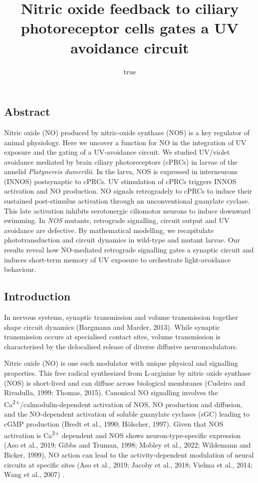 \documentclass[
  10pt,
  onecolumn]{article}
\title{Nitric oxide feedback to ciliary photoreceptor cells gates a UV
avoidance circuit}
\author{true}
\date{}
\begin{document}
\maketitle

\hypertarget{abstract}{%
\subsection{Abstract}\label{abstract}}

Nitric oxide (NO) produced by nitric-oxide synthase (NOS) is a key
regulator of animal physiology. Here we uncover a function for NO in the
integration of UV exposure and the gating of a UV-avoidance circuit. We
studied UV/violet avoidance mediated by brain ciliary photoreceptors
(cPRCs) in larvae of the annelid \emph{Platynereis dumerilii}. In the
larva, NOS is expressed in interneurons (INNOS) postsynaptic to cPRCs.
UV stimulation of cPRCs triggers INNOS activation and NO production. NO
signals retrogradely to cPRCs to induce their sustained post-stimulus
activation through an unconventional guanylate cyclase. This late
activation inhibits serotonergic ciliomotor neurons to induce downward
swimming. In \emph{NOS} mutants, retrograde signalling, circuit output
and UV avoidance are defective. By mathematical modelling, we
recapitulate phototransduction and circuit dynamics in wild-type and
mutant larvae. Our results reveal how NO-mediated retrograde signalling
gates a synaptic circuit and induces short-term memory of UV exposure to
orchestrate light-avoidance behaviour.

\hypertarget{introduction}{%
\subsection{Introduction}\label{introduction}}

In nervous systems, synaptic transmission and volume transmission
together shape circuit dynamics (Bargmann and Marder, 2013). While
synaptic transmission occurs at specialised contact sites, volume
transmission is characterised by the delocalised release of diverse
diffusive neuromodulators.

Nitric oxide (NO) is one such modulator with unique physical and
signalling properties. This free radical synthesized from L-arginine by
nitric oxide synthase (NOS) is short-lived and can diffuse across
biological membranes (Cudeiro and Rivadulla, 1999; Thomas, 2015).
Canonical NO signalling involves the
Ca\textsuperscript{2+}/calmodulin-dependent activation of NOS, NO
production and diffusion, and the NO-dependent activation of soluble
guanylate cyclases (sGC) leading to cGMP production (Bredt et al., 1990;
Hölscher, 1997). Given that NOS activation is Ca\textsuperscript{2+}
dependent and NOS shows neuron-type-specific expression (Aso et al.,
2019; Gibbs and Truman, 1998; Mobley et al., 2022; Wildemann and Bicker,
1999), NO action can lead to the activity-dependent modulation of neural
circuits at specific sites (Aso et al., 2019; Jacoby et al., 2018;
Vielma et al., 2014; Wang et al., 2007) .
\end{document}
